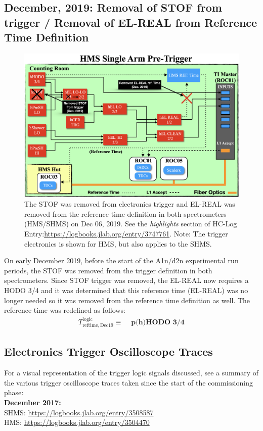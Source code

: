 \documentclass[11pt]{article}
\begin{document}
\subsection{December, 2019: Removal of STOF from trigger / Removal of EL-REAL from Reference Time Definition}\label{ssec:dec2019}
\begin{figure}[H]
  \centering
  \includegraphics[scale=0.38]{./Dec2019_trigger_change.png}
  \caption{The STOF was removed from electronics trigger and EL-REAL was removed from the reference time definition in both spectrometers (HMS/SHMS) on Dec 06, 2019. See the \textit{highlights} section of
    HC-Log Entry:\url{https://logbooks.jlab.org/entry/3747761}. Note: The trigger
  electronics is shown for HMS, but also applies to the SHMS.}
  \label{fig:elreal_refTime_remove}
\end{figure}
\indent On early December 2019, before the start of the A1n/d2n experimental run periods, the STOF was removed from the trigger definition in both spectrometers.
Since STOF trigger was removed, the EL-REAL now requires a HODO 3/4 and it was determined that this reference time (EL-REAL) was no longer needed so it was removed
from the reference time definition as well. The reference time was redefined as follows:
\begin{align}
  T^{\mathrm{logic}}_{\mathrm{reftime,Dec19}} \equiv &\textbf{ p(h)HODO 3/4}
  \label{eq:refTime_def4}
\end{align}
\newpage
\subsection{Electronics Trigger Oscilloscope Traces}\label{ssec:traces}
For a visual representation of the trigger logic signals discussed, see a summary of the various trigger oscilloscope traces taken since the start of the commissioning phase:\\
\newline
\noindent \textbf{December 2017:}\\
SHMS: \url{https://logbooks.jlab.org/entry/3508587}\\
HMS: \url{https://logbooks.jlab.org/entry/3504470}\\
\end{document}
